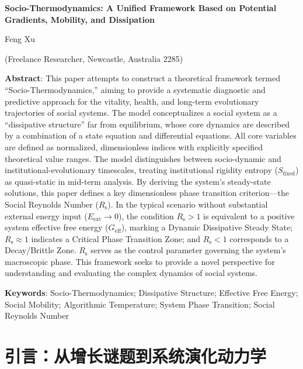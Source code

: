 \documentclass[twocolumn]{ctexart}
\newcommand{\Sfix}{S_{\mathrm{fixed}}}
\newcommand{\Geff}{G_{\mathrm{eff}}}
\newcommand{\Eext}{E_{\mathrm{ext}}}
\newcommand{\Rs}{R_{\mathrm{s}}}
\begin{document}
\begin{center}
\vspace{0.5cm}
{\Large\textbf{Socio-Thermodynamics: A Unified Framework Based on Potential Gradients, Mobility, and Dissipation}}

\vspace{0.3cm}
{\large Feng Xu}

\vspace{0.1cm}
{\small (Freelance Researcher, Newcastle, Australia 2285)}

\vspace{0.5cm}
\begin{minipage}{0.92\textwidth}
{\small\textbf{Abstract}: This paper attempts to construct a theoretical framework termed ``Socio-Thermodynamics,'' aiming to provide a systematic diagnostic and predictive approach for the vitality, health, and long-term evolutionary trajectories of social systems. The model conceptualizes a social system as a ``dissipative structure'' far from equilibrium, whose core dynamics are described by a combination of a state equation and differential equations. All core variables are defined as normalized, dimensionless indices with explicitly specified theoretical value ranges. The model distinguishes between socio-dynamic and institutional-evolutionary timescales, treating institutional rigidity entropy ($\Sfix$) as quasi-static in mid-term analysis. By deriving the system's steady-state solutions, this paper defines a key dimensionless phase transition criterion---the Social Reynolds Number ($\Rs$). In the typical scenario without substantial external energy input ($\Eext\to0$), the condition $\Rs>1$ is equivalent to a positive system effective free energy ($\Geff$), marking a Dynamic Dissipative Steady State; $\Rs\approx1$ indicates a Critical Phase Transition Zone; and $\Rs<1$ corresponds to a Decay/Brittle Zone. $\Rs$ serves as the control parameter governing the system's macroscopic phase. This framework seeks to provide a novel perspective for understanding and evaluating the complex dynamics of social systems.

\noindent\textbf{Keywords}: Socio-Thermodynamics; Dissipative Structure; Effective Free Energy; Social Mobility; Algorithmic Temperature; System Phase Transition; Social Reynolds Number}
\end{minipage}
\end{center}

\section{引言：从增长谜题到系统演化动力学}
\end{document}
